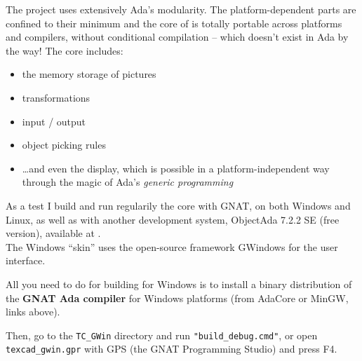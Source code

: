\documentclass[11pt,a4paper]{article}
\begin{document}
The project uses extensively Ada's modularity.
The platform-dependent parts are confined to their minimum and
the core of {\TC} is totally portable across platforms and
compilers, without conditional compilation -- which doesn't exist in Ada
by the way! The core includes:
%
\begin{itemize}
  \item the memory storage of pictures
  \item transformations
  \item input / output
  \item object picking rules
  \item \ldots and even the display, which is possible in a platform-independent
        way through the magic of Ada's {\em generic programming}
\end{itemize}
%
As a test I build and run regularily the core with GNAT, on both Windows
and Linux, as well as with another development system,
ObjectAda 7.2.2 SE (free version), available at .\\

The Windows ``skin'' uses the open-source framework GWindows for the user interface.

All you need to do for building {\TC} for Windows is to install 
a binary distribution of the {\bf GNAT Ada compiler} for Windows platforms
(from AdaCore or MinGW, links above).

Then, go to the {\tt TC\_GWin} directory and run {\tt "build\_debug.cmd"},
or open {\tt texcad\_gwin.gpr} with GPS (the GNAT Programming Studio) and press F4.
\end{document}
